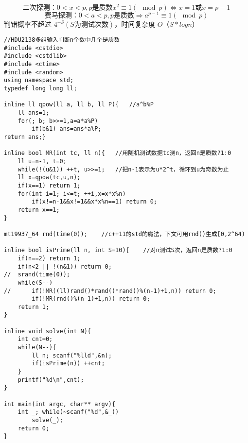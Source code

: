 $$二次探测：0<x<p,p是质数 x^2 \equiv 1(\mod p) \Leftrightarrow x=1或x=p-1$$
$$费马探测：0<a<p,p是质数 \Rightarrow a^{p-1} \equiv 1(\mod p)$$
判错概率不超过 $4^{-S}(S为测试次数)$，时间复杂度 $O（S*logn）$
\begin{lstlisting}
//HDU2138多组输入判断n个数中几个是质数
#include <cstdio>
#include <cstdlib>
#include <ctime>
#include <random>
using namespace std;
typedef long long ll;

inline ll qpow(ll a, ll b, ll P){	//a^b%P
	ll ans=1;
	for(; b; b>>=1,a=a*a%P)
		if(b&1) ans=ans*a%P;
return ans;}

inline bool MR(int tc, ll n){	//用随机测试数据tc测n，返回n是质数?1:0
	ll u=n-1, t=0;
	while(!(u&1)) ++t, u>>=1;	//把n-1表示为u*2^t，循环到u为奇数为止
	ll x=qpow(tc,u,n);
	if(x==1) return 1;
	for(int i=1; i<=t; ++i,x=x*x%n)
		if(x!=n-1&&x!=1&&x*x%n==1) return 0;
	return x==1;
}

mt19937_64 rnd(time(0));	//c++11的std的魔法，下文可用rnd()生成[0,2^64)

inline bool isPrime(ll n, int S=10){	//对n测试S次，返回n是质数?1:0
	if(n==2) return 1;
	if(n<2 || !(n&1)) return 0;
//	srand(time(0));
	while(S--)
//		if(!MR((ll)rand()*rand()*rand()%(n-1)+1,n)) return 0;
		if(!MR(rnd()%(n-1)+1,n)) return 0;
	return 1;
}
 
inline void solve(int N){
	int cnt=0;
	while(N--){
		ll n; scanf("%lld",&n);
		if(isPrime(n)) ++cnt;
	}
	printf("%d\n",cnt);
}

int main(int argc, char** argv){
	int _; while(~scanf("%d",&_))
		solve(_);
	return 0;
}
\end{lstlisting}
